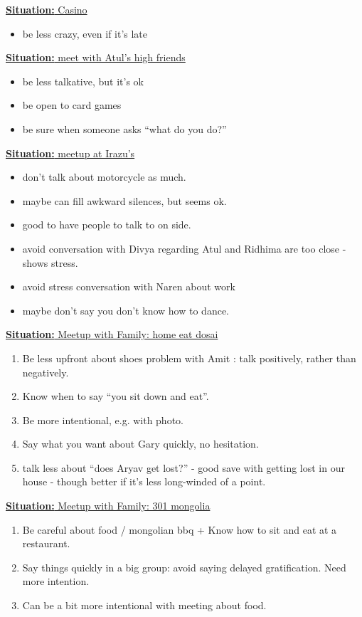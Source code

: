 \documentclass[11pt]{article}
\newcommand{\newSituation}[1]{\underline{\textbf{Situation:} #1} }
\begin{document}
\newSituation{Casino} 
\begin{itemize}
\item be less crazy, even if it's late 
\end{itemize}


\newSituation{meet with Atul's high friends} 
\begin{itemize}
\item be less talkative, but it's ok 
\item be open to card games 
\item be sure when someone asks ``what do you do?''
\end{itemize}

\newSituation{meetup at Irazu's} 
\begin{itemize}
\item don't talk about motorcycle as much. 
\item maybe can fill awkward silences, but seems ok. 
\item good to have people to talk to on side. 
\item avoid conversation with Divya regarding Atul and Ridhima are too close - shows stress. 
\item avoid stress conversation with Naren about work 
\item maybe don't say you don't know how to dance. 
\end{itemize} 


\newSituation{Meetup with Family: home eat dosai}
\begin{enumerate}
\item Be less upfront about shoes problem with Amit  : talk positively, rather than negatively. 
\item Know when to say ``you sit down and eat''. 
\item Be more intentional, e.g. with photo. 
\item Say what you want about Gary quickly, no hesitation. 
\item talk less about ``does Aryav get lost?'' - good save 
with getting lost in our house - though better if it's less long-winded of a point. 
\end{enumerate} 

\newSituation{Meetup with Family: 301 mongolia}
\begin{enumerate}
\item Be careful about food / mongolian bbq  + Know how to sit and eat at a restaurant. 
\item Say things quickly in a big group: avoid saying delayed gratification. Need more intention. 
\item Can be a bit more intentional with meeting about food. 
\end{enumerate} 
\end{document}
